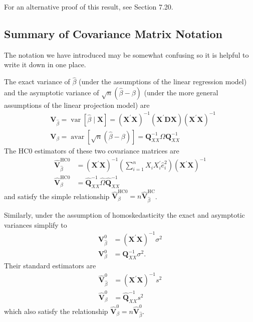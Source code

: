 \documentclass[10pt]{article}
\begin{document}
For an alternative proof of this result, see Section 7.20.

\subsection{Summary of Covariance Matrix Notation}
The notation we have introduced may be somewhat confusing so it is helpful to write it down in one place.

The exact variance of $\widehat{\beta}$ (under the assumptions of the linear regression model) and the asymptotic variance of $\sqrt{n}(\widehat{\beta}-\beta)$ (under the more general assumptions of the linear projection model) are
$$
\begin{aligned}
&\boldsymbol{V}_{\widehat{\beta}}=\operatorname{var}[\widehat{\beta} \mid \boldsymbol{X}]=\left(\boldsymbol{X}^{\prime} \boldsymbol{X}\right)^{-1}\left(\boldsymbol{X}^{\prime} \boldsymbol{D} \boldsymbol{X}\right)\left(\boldsymbol{X}^{\prime} \boldsymbol{X}\right)^{-1} \\
&\boldsymbol{V}_{\beta}=\operatorname{avar}[\sqrt{n}(\widehat{\beta}-\beta)]=\boldsymbol{Q}_{X X}^{-1} \Omega \boldsymbol{Q}_{X X}^{-1}
\end{aligned}
$$
The HC0 estimators of these two covariance matrices are
$$
\begin{aligned}
\widehat{\boldsymbol{V}}_{\widehat{\beta}}^{\mathrm{HC} 0} &=\left(\boldsymbol{X}^{\prime} \boldsymbol{X}\right)^{-1}\left(\sum_{i=1}^{n} X_{i} X_{i}^{\prime} \widehat{e}_{i}^{2}\right)\left(\boldsymbol{X}^{\prime} \boldsymbol{X}\right)^{-1} \\
\widehat{\boldsymbol{V}}_{\beta}^{\mathrm{HC} 0} &=\widehat{\boldsymbol{Q}}_{X X}^{-1} \widehat{\Omega} \widehat{\boldsymbol{Q}}_{X X}^{-1}
\end{aligned}
$$
and satisfy the simple relationship $\widehat{\boldsymbol{V}}_{\beta}^{\mathrm{HC} 0}=n \widehat{\boldsymbol{V}}_{\widehat{\beta}}^{\mathrm{HC}}$.

Similarly, under the assumption of homoskedasticity the exact and asymptotic variances simplify to
$$
\begin{aligned}
\boldsymbol{V}_{\widehat{\beta}}^{0} &=\left(\boldsymbol{X}^{\prime} \boldsymbol{X}\right)^{-1} \sigma^{2} \\
\boldsymbol{V}_{\beta}^{0} &=\boldsymbol{Q}_{X X}^{-1} \sigma^{2} .
\end{aligned}
$$
Their standard estimators are
$$
\begin{aligned}
\widehat{\boldsymbol{V}}_{\widehat{\beta}}^{0} &=\left(\boldsymbol{X}^{\prime} \boldsymbol{X}\right)^{-1} s^{2} \\
\widehat{\boldsymbol{V}}_{\beta}^{0} &=\widehat{\boldsymbol{Q}}_{X X}^{-1} s^{2}
\end{aligned}
$$
which also satisfy the relationship $\widehat{\boldsymbol{V}}_{\beta}^{0}=n \widehat{\boldsymbol{V}}_{\widehat{\beta}}^{0}$.
\end{document}

